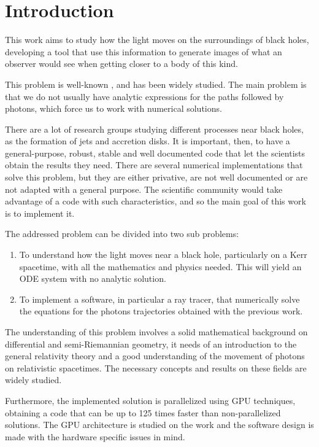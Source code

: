 \chapter{Introduction}

This work aims to study how the light moves on the surroundings of black holes, developing a tool that use this information to generate images of what an observer would see when getting closer to a body of this kind.

This problem is well-known \cite{oneill83} \cite{oneill95}, and has been widely studied. The main problem is that we do not usually have analytic expressions for the paths followed by photons, which force us to work with numerical solutions.

There are a lot of research groups studying different processes near black holes, as the formation of jets and accretion disks. It is important, then, to have a general-purpose, robust, stable and well documented code that let the scientists obtain the results they need. There are several numerical implementations \cite{thorne15} \cite{chan13} that solve this problem, but they are either privative, are not well documented or are not adapted with a general purpose. The scientific community would take advantage of a code with such characteristics, and so the main goal of this work is to implement it.

The addressed problem can be divided into two sub problems:
\begin{enumerate}
	\item To understand how the light moves near a black hole, particularly on a Kerr spacetime, with all the mathematics and physics needed. This will yield an \ac{ODE} system with no analytic solution.
	\item To implement a software, in particular a ray tracer, that numerically solve the equations for the photons trajectories obtained with the previous work.
\end{enumerate}

The understanding of this problem involves a solid mathematical background on differential and semi-Riemannian geometry, it needs of an introduction to the general relativity theory and a good understanding of the movement of photons on relativistic spacetimes. The necessary concepts and results on these fields are widely studied.

Furthermore, the implemented solution is parallelized using \ac{GPU} techniques, obtaining a code that can be up to 125 times faster than non-parallelized solutions. The \ac{GPU} architecture is studied on the work and the software design is made with the hardware specific issues in mind.

